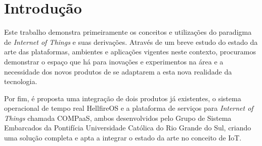 \section{Introdução}
Este trabalho demonstra primeiramente os conceitos e utilizações do paradigma de
\textit{Internet of Things} e suas derivações. Através de um breve estudo do estado
da arte das plataformas, ambientes e aplicações vigentes neste contexto, procuramos
demonstrar o espaço que há para inovações e experimentos na área e a necessidade
dos novos produtos de se adaptarem a esta nova realidade da tecnologia.

Por fim, é proposta uma integração de dois produtos já existentes, o sistema
operacional de tempo real HellfireOS e a plataforma de serviços para \textit{Internet of Things}
chamada COMPaaS, ambos desenvolvidos pelo Grupo de Sistema Embarcados da Pontifícia Universidade
Católica do Rio Grande do Sul, criando uma solução completa e apta a integrar o estado da 
arte no conceito de IoT.
